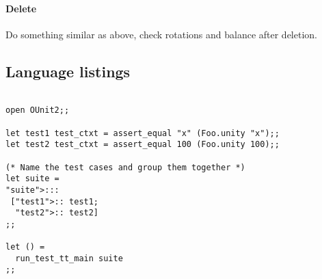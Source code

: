 \documentclass{article}
\begin{document}
\paragraph{Delete}

Do something similar as above, check
rotations and balance after deletion.


\subsection{Language listings}

\begin{lstlisting}[frame=single]  % Start your code-block

open OUnit2;;

let test1 test_ctxt = assert_equal "x" (Foo.unity "x");;
let test2 test_ctxt = assert_equal 100 (Foo.unity 100);;

(* Name the test cases and group them together *)
let suite =
"suite">:::
 ["test1">:: test1;
  "test2">:: test2]
;;

let () =
  run_test_tt_main suite
;;
\end{lstlisting}
\end{document}
